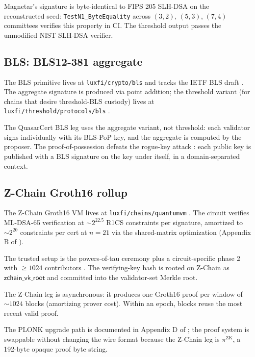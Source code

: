 Magnetar's signature is byte-identical to FIPS 205 SLH-DSA on the
reconstructed seed: \texttt{TestN1\_ByteEquality} across $(3,2)$,
$(5,3)$, $(7,4)$ committees verifies this property in CI. The
threshold output passes the unmodified NIST SLH-DSA verifier.

\subsection{BLS: BLS12-381 aggregate}

The BLS primitive \cite{cryptorepo} lives at
\texttt{luxfi/crypto/bls} and tracks the IETF BLS draft
\cite{ietfbls}. The aggregate signature is produced via point
addition; the threshold variant (for chains that desire threshold-BLS
custody) lives at \texttt{luxfi/threshold/protocols/bls}
\cite{thresholdrepo}.

The QuasarCert BLS leg uses the aggregate variant, not threshold:
each validator signs individually with its BLS-PoP key, and the
aggregate is computed by the proposer. The proof-of-possession
defeats the rogue-key attack \cite{boldyreva2003,bonehshorth}: each
public key is published with a BLS signature on the key under
itself, in a domain-separated context.

\subsection{Z-Chain Groth16 rollup}

The Z-Chain Groth16 VM lives at \texttt{luxfi/chains/quantumvm}
\cite{chainsrepo}. The circuit verifies ML-DSA-65 verification at
$\sim 2^{22.5}$ R1CS constraints per signature, amortized to
$\sim 2^{20}$ constraints per cert at $n = 21$ via the shared-matrix
optimization (Appendix B of \cite{quasarcertsoundness}).

The trusted setup is the powers-of-tau ceremony plus a
circuit-specific phase 2 with $\geq 1024$ contributors
\cite{bowegabizonmiers}. The verifying-key hash is rooted on
Z-Chain as $\mathsf{zchain\_vk\_root}$ and committed into the
validator-set Merkle root.

The Z-Chain leg is asynchronous: it produces one Groth16 proof per
window of $\sim 1024$ blocks (amortizing prover cost). Within an
epoch, blocks reuse the most recent valid proof.

The PLONK upgrade path is documented in Appendix D of
\cite{quasarcertsoundness}; the proof system is swappable
without changing the wire format because the Z-Chain leg is
$\pi^{\mathrm{ZK}}$, a 192-byte opaque proof byte string.

